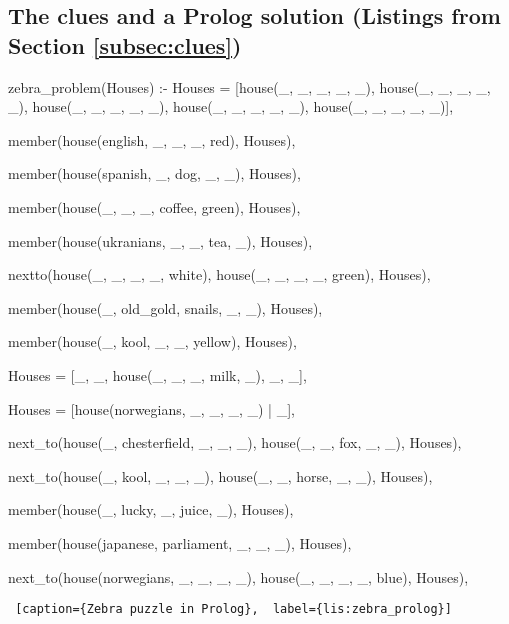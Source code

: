 \subsection{The clues and a Prolog solution (Listings from Section \ref{subsec:clues})} \label{appsubsec:clues}

\begin{minipage}{\linewidth}
\hrulefill
\begin{python}
zebra_problem(Houses) :-
    Houses = [house(_, _, _, _, _), house(_, _, _, _, _), house(_, _, _, _, _), 
              house(_, _, _, _, _), house(_, _, _, _, _)], 

    member(house(english, _, _, _, red), Houses), 

    member(house(spanish, _, dog, _, _), Houses), 

    member(house(_, _, _, coffee, green), Houses), 

    member(house(ukranians, _, _, tea, _), Houses), 

    nextto(house(_, _, _, _, white), house(_, _, _, _, green), Houses), 

    member(house(_, old_gold, snails, _, _), Houses), 

    member(house(_, kool, _, _, yellow), Houses), 

    Houses = [_, _, house(_, _, _, milk, _), _, _], 

    Houses = [house(norwegians, _, _, _, _) | _], 

    next_to(house(_, chesterfield, _, _, _), house(_, _, fox, _, _), Houses), 

    next_to(house(_, kool, _, _, _), house(_, _, horse, _, _), Houses), 

    member(house(_, lucky, _, juice, _), Houses), 

    member(house(japanese, parliament, _, _, _), Houses), 

    next_to(house(norwegians, _, _, _, _), house(_, _, _, _, blue), Houses), 
\end{python}
\begin{lstlisting} [caption={Zebra puzzle in Prolog},  label={lis:zebra_prolog}]
\end{lstlisting}
\end{minipage}

